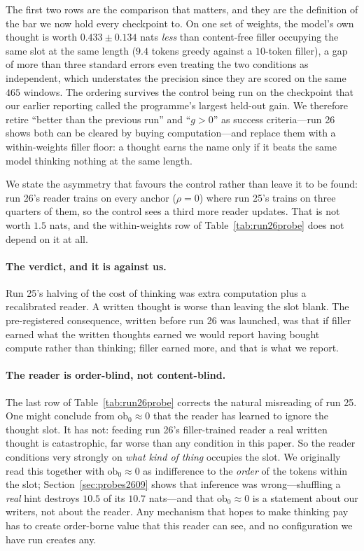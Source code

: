 \documentclass{article} %
\begin{document}
The first two rows are the comparison that matters, and they are the definition of the bar we now hold every checkpoint to. On one set of weights, the model's own thought is worth $0.433 \pm 0.134$ nats \emph{less} than content-free filler occupying the same slot at the same length ($9.4$ tokens greedy against a $10$-token filler), a gap of more than three standard errors even treating the two conditions as independent, which understates the precision since they are scored on the same $465$ windows. The ordering survives the control being run on the checkpoint that our earlier reporting called the programme's largest held-out gain. We therefore retire ``better than the previous run'' and ``$g > 0$'' as success criteria---run 26 shows both can be cleared by buying computation---and replace them with a within-weights filler floor: a thought earns the name only if it beats the same model thinking nothing at the same length.

We state the asymmetry that favours the control rather than leave it to be found: run 26's reader trains on every anchor ($\rho = 0$) where run 25's trains on three quarters of them, so the control sees a third more reader updates. That is not worth $1.5$ nats, and the within-weights row of Table~\ref{tab:run26probe} does not depend on it at all.

\paragraph{The verdict, and it is against us.} Run 25's halving of the cost of thinking was extra computation plus a recalibrated reader. A written thought is worse than leaving the slot blank. The pre-registered consequence, written before run 26 was launched, was that if filler earned what the written thoughts earned we would report having bought compute rather than thinking; filler earned more, and that is what we report.

\paragraph{The reader is order-blind, not content-blind.} The last row of Table~\ref{tab:run26probe} corrects the natural misreading of run 25. One might conclude from $\mathrm{ob}_0 \approx 0$ that the reader has learned to ignore the thought slot. It has not: feeding run 26's filler-trained reader a real written thought is catastrophic, far worse than any condition in this paper. So the reader conditions very strongly on \emph{what kind of thing} occupies the slot. We originally read this together with $\mathrm{ob}_0 \approx 0$ as indifference to the \emph{order} of the tokens within the slot; Section~\ref{sec:probes2609} shows that inference was wrong---shuffling a \emph{real} hint destroys $10.5$ of its $10.7$ nats---and that $\mathrm{ob}_0 \approx 0$ is a statement about our writers, not about the reader. Any mechanism that hopes to make thinking pay has to create order-borne value that this reader can see, and no configuration we have run creates any.
\end{document}
